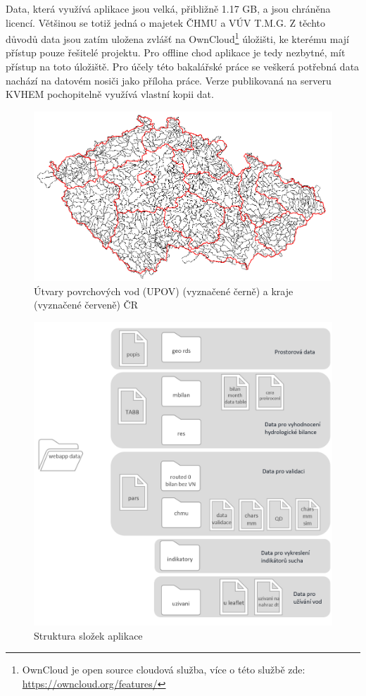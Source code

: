 \documentclass[12pt,]{article}
\let\rmarkdownfootnote\footnote%
\def\footnote{\protect\rmarkdownfootnote}
\begin{document}
\qquad Data, která využívá aplikace jsou velká, přibližně 1.17 GB, a
jsou chráněna licencí. Většinou se totiž jedná o majetek ČHMU a VÚV
T.M.G. Z těchto důvodů data jsou zatím uložena zvlášť na
OwnCloud\footnote{OwnCloud je open source cloudová služba, více o této
  službě zde: \url{https://owncloud.org/features/}} úložišti, ke kterému
mají přístup pouze řešitelé projektu. Pro offline chod aplikace je tedy
nezbytné, mít přístup na toto úložiště. Pro účely této bakalářské práce
se veškerá potřebná data nachází na datovém nosiči jako příloha práce.
Verze publikovaná na serveru KVHEM pochopitelně využívá vlastní kopii
dat.

\begin{figure}[H]
      \includegraphics[width=\textwidth]{fig/povodi-kraje}
      \caption{Útvary povrchových vod (UPOV) (vyznačené černě) a kraje (vyznačené červeně) ČR}
      \label{fig:ch5.0}
\end{figure}

\begin{figure}[H]
      \includegraphics[width=\textwidth]{fig/struktura2}
      \caption{Struktura složek aplikace}
      \label{fig:ch5.1}
\end{figure}
\end{document}
